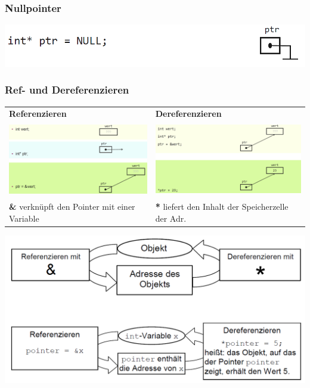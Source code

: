 		\subsubsection{Nullpointer}
			\begin{minipage}{1\linewidth}
				\includegraphics[width=0.95\linewidth]{Bilder/nullpointer.png}
			\end{minipage}

		\subsubsection{Ref- und Dereferenzieren}
			\begin{tabular}{l|l}
				\textbf{Referenzieren} & \textbf{Dereferenzieren} \\
				\includegraphics[height=3.2cm]{Bilder/referenzieren.png} &  \includegraphics[height=3.2cm]{Bilder/dereferenzieren.png} \\
				\textbf{\&} verknüpft den Pointer mit einer Variable   &  \textbf{*} liefert den Inhalt der Speicherzelle der Adr. \\
			\end{tabular}

			\begin{minipage}{1\linewidth}
				\includegraphics[width=0.5\linewidth]{Bilder/vergl-ref-deref.png}
			\end{minipage}

